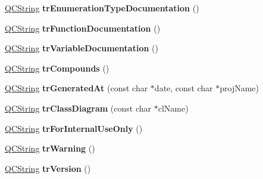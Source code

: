 \begin{DoxyCompactItemize}
\mbox{\hyperlink{class_q_c_string}{Q\+C\+String}} {\bfseries tr\+Enumeration\+Type\+Documentation} ()
\item 
\mbox{\label{class_translator_croatian_a2e336597d19d9ea8c5df09bd7bf65937}} 
\mbox{\hyperlink{class_q_c_string}{Q\+C\+String}} {\bfseries tr\+Function\+Documentation} ()
\item 
\mbox{\label{class_translator_croatian_a2ed67492cfd56be401198d8154de28b7}} 
\mbox{\hyperlink{class_q_c_string}{Q\+C\+String}} {\bfseries tr\+Variable\+Documentation} ()
\item 
\mbox{\label{class_translator_croatian_a747009dcb43c58c1d5fdf5d9949616f8}} 
\mbox{\hyperlink{class_q_c_string}{Q\+C\+String}} {\bfseries tr\+Compounds} ()
\item 
\mbox{\label{class_translator_croatian_a427f067d9646f1b1c3c19d73ae80aa7c}} 
\mbox{\hyperlink{class_q_c_string}{Q\+C\+String}} {\bfseries tr\+Generated\+At} (const char $\ast$date, const char $\ast$proj\+Name)
\item 
\mbox{\label{class_translator_croatian_a26a2500dd7c91cb7c6d71f059eb90062}} 
\mbox{\hyperlink{class_q_c_string}{Q\+C\+String}} {\bfseries tr\+Class\+Diagram} (const char $\ast$cl\+Name)
\item 
\mbox{\label{class_translator_croatian_ac3aa0f6c78ed181d65a5c9c65a466762}} 
\mbox{\hyperlink{class_q_c_string}{Q\+C\+String}} {\bfseries tr\+For\+Internal\+Use\+Only} ()
\item 
\mbox{\label{class_translator_croatian_a0000abe53d64eead4500194419f8f0f0}} 
\mbox{\hyperlink{class_q_c_string}{Q\+C\+String}} {\bfseries tr\+Warning} ()
\item 
\mbox{\label{class_translator_croatian_aa54821992f7c1f8fcbd1fd7cfac0d636}} 
\mbox{\hyperlink{class_q_c_string}{Q\+C\+String}} {\bfseries tr\+Version} ()
\item 
\mbox{\label{class_translator_croatian_a4cd393a6fd8db1d7fc9f05352bc018c2}} 

\end{DoxyCompactItemize}
